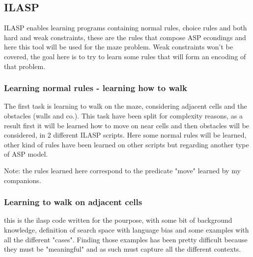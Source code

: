 \subsection{ILASP}

ILASP enables learning programs containing normal rules, choice rules and both hard and weak constraints, these are the rules that compose ASP econdings and here this tool will be used for the maze problem. Weak constraints won't be covered, the goal here is to try to learn some rules that will form an encoding of that problem.

\subsubsection{Learning normal rules - learning how to walk}

The first task is learning to walk on the maze, considering adjacent cells and the obstacles (walls and co.). This task have been split for complexity reasons, as a result first it will be learned how to move on near cells and then obstacles will be considered, in 2 different ILASP scripts. Here some normal rules will be learned, other kind of rules have been learned on other scripts but regarding another type of ASP model. 

Note: the rules learned here correspond to the predicate "move" learned by my companions.

\subsubsection{Learning to walk on adjacent cells}

this is the ilasp code written for the pourpose, with some bit of background knowledge, definition of search space with language bias and some examples with all the different "cases".  Finding those examples has been pretty difficult because they must be "meaningful" and as such must capture all the different contexts.

